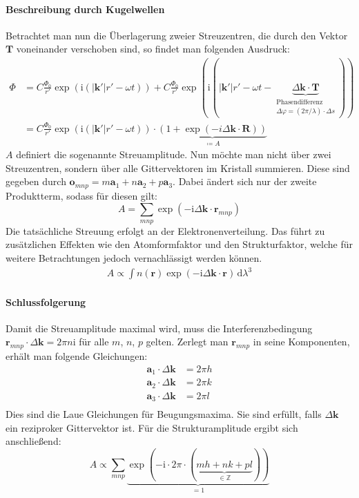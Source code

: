 \paragraph{Beschreibung durch Kugelwellen}
Betrachtet man nun die Überlagerung zweier Streuzentren, die durch den Vektor $\mathbf{T}$ voneinander verschoben sind,
so findet man folgenden Ausdruck:
\begin{align*}
    \Phi &= C \frac{\Phi_{0}}{r'}\exp(\mathrm{i}(\lvert \mathbf{k}' \rvert r'-\omega t)) + C\frac{\Phi_{0}}{r'}
    \exp(\mathrm{i}(\lvert \mathbf{k}' \rvert r'-\omega t- \underbrace{ \Delta \mathbf{k}\cdot \mathbf{T} }_{
        \substack{\text{Phasendifferenz} \\ \Delta\varphi=(2\pi / \lambda) \cdot \Delta s  }})) \\
    &=C \frac{\Phi_{0}}{r'}\exp(\mathrm{i}(\lvert \mathbf{k}' \rvert r'-\omega t))\cdot\underbrace{ (1+\exp(-i \Delta
    \mathbf{k}\cdot \mathbf{R})) }_{ \coloneqq A }
\end{align*}
$A$ definiert die sogenannte Streuamplitude.
Nun möchte man nicht über zwei Streuzentren, sondern über alle Gittervektoren im Kristall summieren.
Diese sind gegeben durch $\mathbf{o}_{mnp}=m\mathbf{a}_{1}+n\mathbf{a}_{2}+p\mathbf{a}_{3}$.
Dabei ändert sich nur der zweite Produktterm, sodass für diesen gilt:
\begin{equation*}
    A = \sum_{mnp}\exp(-\mathrm{i} \Delta \mathbf{k}\cdot \mathbf{r}_{mnp})
\end{equation*}
Die tatsächliche Streuung erfolgt an der Elektronenverteilung.
Das führt zu zusätzlichen Effekten wie den Atomformfaktor und den Strukturfaktor,
welche für weitere Betrachtungen jedoch vernachlässigt werden können.
\begin{align*}
    A \propto \int n(\mathbf{r}) \exp(-\mathrm{i} \Delta \mathbf{k}\cdot \mathbf{r}) \, \mathrm{d}\lambda^{3}
\end{align*}

\paragraph{Schlussfolgerung}
Damit die Streuamplitude maximal wird, muss die Interferenzbedingung $\mathbf{r}_{mnp}\cdot\Delta \mathbf{k} =2\pi n$i
für alle $m$, $n$, $p$ gelten.
Zerlegt man $\mathbf{r}_{mnp}$ in seine Komponenten, erhält man folgende Gleichungen:
\begin{align*}
    \mathbf{a}_{1}\cdot\Delta \mathbf{k} &= 2\pi h \\
    \mathbf{a}_{2}\cdot\Delta \mathbf{k} &= 2\pi k \\
    \mathbf{a}_{3}\cdot\Delta \mathbf{k} &= 2\pi l \\
\end{align*}
Dies sind die Laue Gleichungen für Beugungsmaxima.
Sie sind erfüllt, falls $\Delta \mathbf{k}$ ein reziproker Gittervektor ist.
Für die Strukturamplitude ergibt sich anschließend:
\begin{equation*}
    A \propto \sum_{mnp} \underbrace{ \exp(-\mathrm{i}
    \cdot2\pi\cdot(\underbrace{ mh+nk+pl }_{ \in\mathbb{Z} })) }_{ =1 }
\end{equation*}


